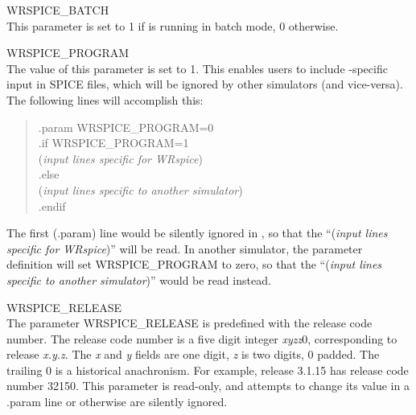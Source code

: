 \begin{description}
\item{\vt WRSPICE\_BATCH}\\
This parameter is set to 1 if {\WRspice} is running in batch mode, 0
otherwise.

\item{\vt WRSPICE\_PROGRAM}\\
The value of this parameter is set to 1.  This enables users to
include {\WRspice}-specific input in SPICE files, which will be
ignored by other simulators (and vice-versa).  The following lines
will accomplish this:

\begin{quote}
{\vt .param WRSPICE\_PROGRAM=0}\\
{\vt .if WRSPICE\_PROGRAM=1}\\
({\it input lines specific for WRspice\/})\\
{\vt .else}\\
({\it input lines specific to another simulator\/})\\
{\vt .endif}\\
\end{quote}

The first ({\vt .param}) line would be silently ignored in {\WRspice},
so that the ``({\it input lines specific for WRspice\/})'' will be
read.  In another simulator, the parameter definition will set {\vt
WRSPICE\_PROGRAM} to zero, so that the ``({\it input lines specific to
another simulator\/})'' would be read instead.

\item{\vt WRSPICE\_RELEASE}\\
The parameter {\vt WRSPICE\_RELEASE} is predefined with the release
code number.  The release code number is a five digit integer {\it
xyzz\/}0, corresponding to release {\it x.y.z}.  The {\it x} and {\it
y} fields are one digit, {\it z} is two digits, 0 padded.  The
trailing 0 is a historical anachronism.  For example, release 3.1.15
has release code number 32150.  This parameter is read-only, and
attempts to change its value in a {\vt .param} line or otherwise are
silently ignored.
\end{description}


